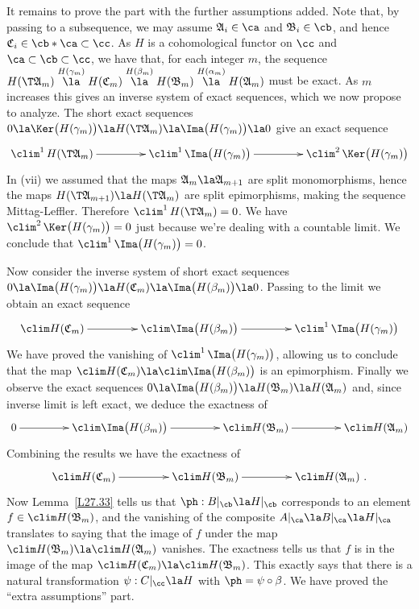 \documentclass[11pt]{amsart}
\begin{document}
It remains to prove the part with the further assumptions added. Note
that, by passing to a subsequence, we may assume $\mathfrak{A}_i\in\ca$
and $\mathfrak{B}_i\in\cb$,
and hence $\mathfrak{C}_i\in\cb*\ca\subset\cc$.
As $H$ is a cohomological functor on $\cc$ and $\ca\subset\cb\subset\cc$,
we have that, for each integer $m$, the
sequence
$H(\T \mathfrak{A}_m)\stackrel{H(\gamma_m)}\la H(\mathfrak{C}_m)\stackrel{H(\beta_m)}\la H(\mathfrak{B}_m)\stackrel{H(\alpha_m)}\la H(\mathfrak{A}_m)$
must be exact. As $m$ increases this 
gives an inverse system of exact sequences, which we now propose to
analyze. The short exact sequences
$0\la \Ker\big(H(\gamma_m)\big)
\la H(\T \mathfrak{A}_m)\la \Ima\big(H(\gamma_m)\big)\la 0$
give an exact sequence
\[
\xymatrix@C+20pt{
  \clim^1\, H(\T \mathfrak{A}_m) \ar[r]  & \clim^1\,\Ima\big(H(\gamma_m)\big)\ar[r] &
  \clim^2\, \Ker\big(H(\gamma_m)\big)
}
\]
In (vii) we assumed that the maps $\mathfrak{A}_m\la \mathfrak{A}_{m+1}$
are split monomorphisms, hence
the maps $H(\T \mathfrak{A}_{m+1})\la H(\T \mathfrak{A}_m)$ are split
epimorphisms, making the sequence
Mittag-Leffler. Therefore $\clim^1\,H(\T \mathfrak{A}_m)=0$.
We have
$\clim^2\, \Ker\big(H(\gamma_m)\big)=0$ just because we're dealing
with a countable limit. We conclude that
$\clim^1\,\Ima\big(H(\gamma_m)\big)=0$.

Now consider the inverse system of short exact sequences
$0\la \Ima\big(H(\gamma_m)\big)\la
H(\mathfrak{C}_m)\la \Ima\big(H(\beta_m)\big)\la 0$.
Passing to the limit we obtain an exact sequence
\[
\xymatrix@C+20pt{
  \clim H(\mathfrak{C}_m) \ar[r]  & \clim\Ima\big(H(\beta_m)\big)\ar[r] &
  \clim^1\, \Ima\big(H(\gamma_m)\big)
}
\]
We have proved the vanishing of $\clim^1\, \Ima\big(H(\gamma_m)\big)$,
allowing us to
conclude that the map $\clim H(\mathfrak{C}_m) \la \clim\Ima\big(H(\beta_m)\big)$
is an epimorphism. Finally we observe the exact sequences
$0\la \Ima\big(H(\beta_m)\big) \la H(\mathfrak{B}_m)\la H(\mathfrak{A}_m)$
and, since inverse limit is left exact, we deduce the exactness of
\[
\xymatrix@C+20pt{
0\ar[r]  & \clim\Ima\big(H(\beta_m)\big)\ar[r] &
  \clim H(\mathfrak{B}_m)\ar[r] & \clim H(\mathfrak{A}_m)
}
\]
Combining the results we have the exactness of
\[
\xymatrix@C+20pt{
\clim H(\mathfrak{C}_m)\ar[r] &
  \clim H(\mathfrak{B}_m)\ar[r] & \clim H(\mathfrak{A}_m)\ .
}
\]
Now Lemma~\ref{L27.33} tells us that $\ph:B|_\cb\la H|_\cb$
corresponds to an element $f\in\clim H(\mathfrak{B}_m)$, and the
vanishing of the composite
$A|_\ca\la B|_\ca\la H|_\ca$
translates to saying that the image of $f$ under the map
$\clim H(\mathfrak{B}_m)\la\clim H(\mathfrak{A}_m)$ vanishes.
The exactness tells us that $f$ is in the image of the
map $\clim H(\mathfrak{C}_m)\la\clim H(\mathfrak{B}_m)$. This exactly says
that there is a natural transformation $\psi:C|_\cc\la H$
with $\ph=\psi\circ\beta$. We have proved the ``extra assumptions'' part.
\eprf
\end{document}
